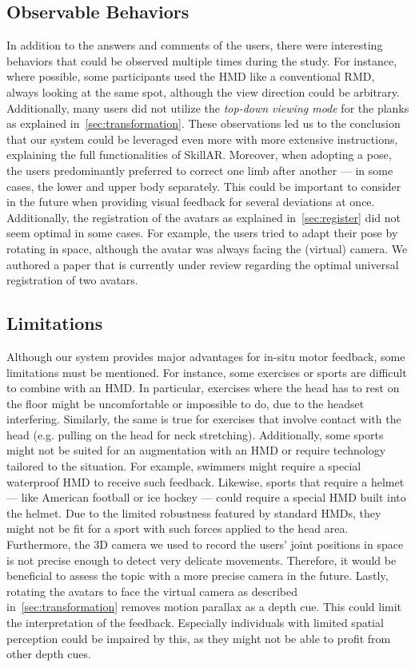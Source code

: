 \subsection{Observable Behaviors \label{sec:behaviors}}
In addition to the answers and comments of the users, there were interesting behaviors that could be observed multiple times during the study. For instance, where possible, some participants used the HMD like a conventional RMD, always looking at the same spot, although the view direction could be arbitrary. Additionally, many users did not utilize the \emph{top-down viewing mode} for the planks as explained in~\autoref{sec:transformation}. These observations led us to the conclusion that our system could be leveraged even more with more extensive instructions, explaining the full functionalities of SkillAR. Moreover, when adopting a pose, the users predominantly preferred to correct one limb after another --- in some cases, the lower and upper body separately. This could be important to consider in the future when providing visual feedback for several deviations at once. Additionally, the registration of the avatars as explained in~\autoref{sec:register} did not seem optimal in some cases. For example, the users tried to adapt their pose by rotating in space, although the avatar was always facing the (virtual) camera. We authored a paper that is currently under review regarding the optimal universal registration of two avatars.

\subsection{Limitations}
Although our system provides major advantages for in-situ motor feedback, some limitations must be mentioned. For instance, some exercises or sports are difficult to combine with an HMD. In particular, exercises where the head has to rest on the floor might be uncomfortable or impossible to do, due to the headset interfering. Similarly, the same is true for exercises that involve contact with the head (e.g. pulling on the head for neck stretching). Additionally, some sports might not be suited for an augmentation with an HMD or require technology tailored to the situation. For example, swimmers might require a special waterproof HMD to receive such feedback. Likewise, sports that require a helmet --- like American football or ice hockey --- could require a special HMD built into the helmet. Due to the limited robustness featured by standard HMDs, they might not be fit for a sport with such forces applied to the head area. Furthermore, the 3D camera we used to record the users' joint positions in space is not precise enough to detect very delicate movements. Therefore, it would be beneficial to assess the topic with a more precise camera in the future. Lastly, rotating the avatars to face the virtual camera as described in~\autoref{sec:transformation} removes motion parallax as a depth cue. This could limit the interpretation of the feedback. Especially individuals with limited spatial perception could be impaired by this, as they might not be able to profit from other depth cues.

